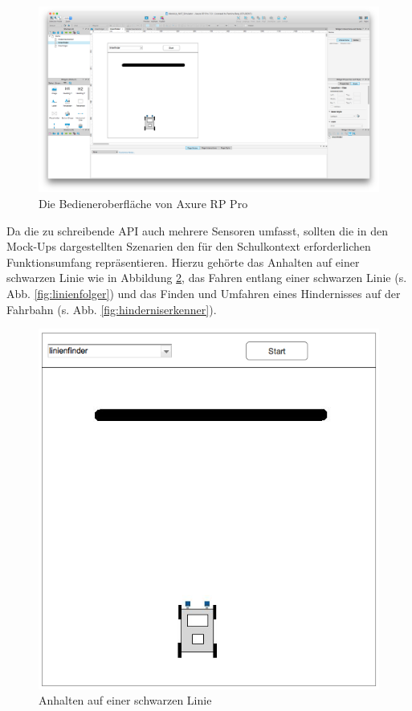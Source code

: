 \documentclass[paper=a4, DIV=calc, BCOR=12mm, twoside=on, onecolumn=on, open = right, titlepage =on, parskip =half-, headsepline = on, footsepline = off, chapterprefix = off, appendixprefix = on, fontsize = 12pt, numbers = noenddot, abstract = on]{scrbook}
\begin{document}
\begin{figure}[htbp]
\centering
\includegraphics[width=\textwidth]{images/axure_mockup.png} 
\caption{Die Bedieneroberfläche von Axure RP Pro}
\label{fig:axure}
\end{figure}

Da die zu schreibende API auch mehrere Sensoren umfasst, sollten die in den Mock-Ups dargestellten Szenarien den für den Schulkontext erforderlichen Funktionsumfang repräsentieren. Hierzu gehörte das Anhalten auf einer schwarzen Linie wie in Abbildung \ref{fig:linienfinder}, das Fahren entlang einer schwarzen Linie (s. Abb. \ref{fig:linienfolger}) und das Finden und Umfahren eines Hindernisses auf der Fahrbahn (s. Abb. \ref{fig:hinderniserkenner}).

\begin{figure}[htbp]
\centering
\includegraphics[scale=0.5]{images/mockup_linienfinder.png}
\caption{Anhalten auf einer schwarzen Linie}
\label{fig:linienfinder}
\end{figure}
\end{document}
